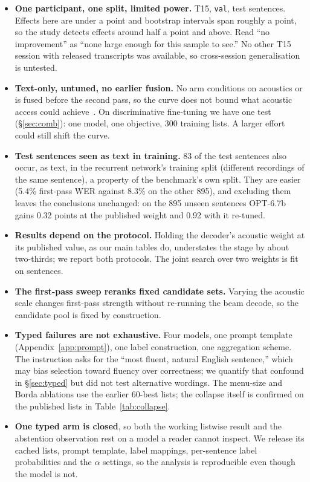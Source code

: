\documentclass[11pt]{article}
\begin{document}
\begin{itemize}\itemsep2pt
\item \textbf{One participant, one split, limited power.} T15, \texttt{val}, \nTest{} test
  sentences. Effects here are under a point and bootstrap intervals span roughly
  a point, so the study detects effects around half a point and above. Read ``no
  improvement'' as ``none large enough for this sample to see.'' No other T15 session with
  released transcripts was available, so cross-session generalisation is untested.
\item \textbf{Text-only, untuned, no earlier fusion.} No arm conditions on acoustics or is
  fused before the second pass, so the curve does not bound what acoustic access could
  achieve~\cite{kim2022joint}. On discriminative fine-tuning we have one test
  (\S\ref{sec:comb}): one model, one objective, 300 training lists. A larger effort could
  still shift the curve.
\item \textbf{Test sentences seen as text in training.} 83 of the \nTest{} test sentences
  also occur, as text, in the recurrent network's training split (different recordings of
  the same sentence), a property of the benchmark's own split. They are easier (5.4\%
  first-pass WER against 8.3\% on the other 895), and excluding them leaves the conclusions
  unchanged: on the 895 unseen sentences OPT-6.7b gains 0.32 points at the published
  weight and 0.92 with it re-tuned.
\item \textbf{Results depend on the protocol.} Holding the decoder's acoustic weight at
  its published value, as our main tables do, understates the stage by about two-thirds;
  we report both protocols. The joint search over two weights is fit on \nDev{} sentences.
\item \textbf{The first-pass sweep reranks fixed candidate sets.} Varying the acoustic
  scale changes first-pass strength without re-running the beam decode, so the candidate
  pool is fixed by construction.
\item \textbf{Typed failures are not exhaustive.} Four models, one prompt template
  (Appendix~\ref{app:prompt}), one label construction, one aggregation scheme. The
  instruction asks for the ``most fluent, natural English sentence,'' which may bias
  selection toward fluency over correctness; we quantify that confound in
  \S\ref{sec:typed} but did not test alternative wordings. The menu-size and Borda
  ablations use the earlier 60-best lists; the collapse itself is confirmed on the
  published lists in Table~\ref{tab:collapse}.
\item \textbf{One typed arm is closed}, so both the working listwise result and the
  abstention observation rest on a model a reader cannot inspect. We release its cached
  lists, prompt template, label mappings, per-sentence label probabilities and the
  $\alpha$ settings, so the analysis is reproducible even though the model is not.
\end{itemize}
\end{document}
